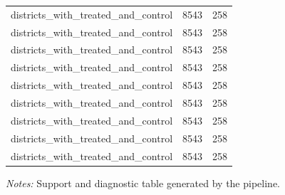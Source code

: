 \begin{table}[!htbp]
\begin{tabular}{lrr}
districts\_with\_treated\_and\_control & 8543 & 258 \\
districts\_with\_treated\_and\_control & 8543 & 258 \\
districts\_with\_treated\_and\_control & 8543 & 258 \\
districts\_with\_treated\_and\_control & 8543 & 258 \\
districts\_with\_treated\_and\_control & 8543 & 258 \\
districts\_with\_treated\_and\_control & 8543 & 258 \\
districts\_with\_treated\_and\_control & 8543 & 258 \\
districts\_with\_treated\_and\_control & 8543 & 258 \\
districts\_with\_treated\_and\_control & 8543 & 258 \\
\bottomrule
\end{tabular}

\begin{minipage}{0.98\textwidth}
\footnotesize \textit{Notes:} Support and diagnostic table generated by the pipeline.
\end{minipage}
\end{table}
